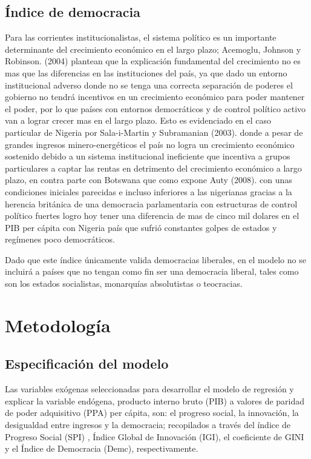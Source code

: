 \documentclass[11pt]{article}
\begin{document}
{\subsection{Índice de democracia}

Para las corrientes institucionalistas, el sistema político es un importante determinante del crecimiento económico en el largo plazo;  Acemoglu, Johnson y Robinson. (2004) plantean que la explicación fundamental del crecimiento no es mas que las diferencias en las instituciones del país, ya que dado un entorno institucional adverso donde no se tenga una correcta separación de poderes el gobierno no tendrá incentivos en un crecimiento económico para poder mantener el poder, por lo que países con entornos democráticos y de control político activo van a lograr crecer mas en el largo plazo. Esto es evidenciado en el caso particular de Nigeria por Sala-i-Martin y Subramanian (2003). donde a pesar de grandes ingresos minero-energéticos el país no logra un crecimiento económico sostenido debido a un sistema institucional ineficiente que incentiva a grupos particulares a captar las rentas en detrimento del crecimiento económico a largo plazo, en contra parte con Botswana que como expone Auty (2008). con unas condiciones iniciales parecidas e incluso inferiores a las nigerianas gracias a la herencia británica de una democracia parlamentaria con estructuras de control político fuertes logro hoy tener una diferencia de mas de cinco mil dolares en el PIB per cápita con Nigeria país que sufrió constantes golpes de estados y regímenes poco democráticos.

Dado que este índice únicamente valida democracias liberales, en el modelo no se incluirá a países que no tengan como fin ser una democracia liberal, tales como son los estados socialistas, monarquías absolutistas o teocracias.


\section{Metodología }

\subsection{Especificación del modelo}
Las variables exógenas seleccionadas para desarrollar el modelo de regresión y explicar la variable endógena,  producto interno bruto (PIB) a valores de paridad de poder adquisitivo (PPA) per cápita, son: el progreso social, la innovación, la desigualdad entre ingresos y la democracia; recopilados a través del índice de Progreso Social (SPI) , Índice Global de Innovación (IGI), el coeficiente de GINI y el Índice de Democracia (Demc), respectivamente. 

}
\end{document}
